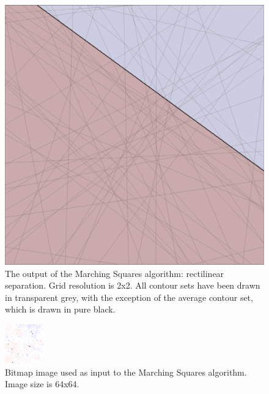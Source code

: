 \documentclass[12pt]{article}
\begin{document}
\begin{figure} 
\centering
  \includegraphics[width = 3 in]{rectilinear.png}
  \caption{The output of the Marching Squares algorithm: rectilinear separation. 
Grid resolution is 2x2.
All contour sets have been drawn in transparent grey, with the exception of the average contour set, which is drawn in pure black.
}
\end{figure}



\begin{figure} 
\centering
  \includegraphics[width = 3 in]{image_avg_no_blur.png}
  \caption{Bitmap image used as input to the Marching Squares algorithm.
Image size is 64x64.
}
\end{figure}
\end{document}
